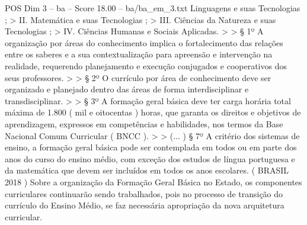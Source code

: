 \begin{textsample}{POS Dim 3 – ba – Score 18.00 – ba/ba\_em\_3.txt}
Linguagens e suas Tecnologias ; > II.
Matemática e suas Tecnologias ; > III.
Ciências da Natureza e suas Tecnologias ; > IV.
Ciências Humanas e Sociais Aplicadas. > > § 1º A organização por áreas do conhecimento implica o fortalecimento das relações entre os saberes e a sua contextualização para apreensão e intervenção na realidade, requerendo planejamento e execução conjugados e cooperativos dos seus professores. > > § 2º O currículo por área de conhecimento deve ser organizado e planejado dentro das áreas de forma interdisciplinar e transdisciplinar. > > § 3º A formação geral básica deve ter carga horária total máxima de 1.800 ( mil e oitocentas ) horas, que garanta os direitos e objetivos de aprendizagem, expressos em competências e habilidades, nos termos da Base Nacional Comum Curricular ( BNCC ). > > (... ) § 7º A critério dos sistemas de ensino, a formação geral básica pode ser contemplada em todos ou em parte dos anos do curso do ensino médio, com exceção dos estudos de língua portuguesa e da matemática que devem ser incluídos em todos os anos escolares. ( BRASIL 2018 ) Sobre a organização da Formação Geral Básica no Estado, os componentes curriculares continuarão sendo trabalhados, pois no processo de transição do currículo do Ensino Médio, se faz necessária apropriação da nova arquitetura curricular.

\end{textsample}
